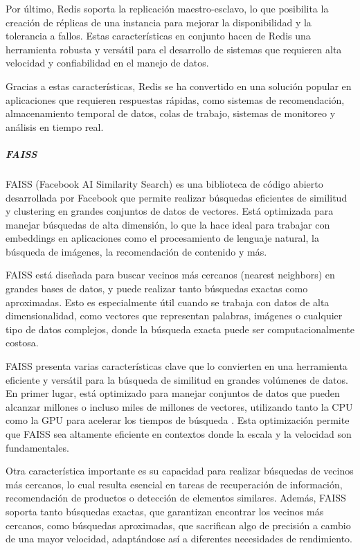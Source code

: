 Por último, Redis soporta la replicación maestro-esclavo, lo que posibilita la creación de réplicas de una instancia para mejorar la disponibilidad y la tolerancia a fallos. Estas características en conjunto hacen de Redis una herramienta robusta y versátil para el desarrollo de sistemas que requieren alta velocidad y confiabilidad en el manejo de datos.

Gracias a estas características, Redis se ha convertido en una solución popular en aplicaciones que requieren respuestas rápidas, como sistemas de recomendación, almacenamiento temporal de datos, colas de trabajo, sistemas de monitoreo y análisis en tiempo real.

\subparagraph{FAISS}    

FAISS (Facebook AI Similarity Search) es una biblioteca de código abierto desarrollada por Facebook que permite realizar búsquedas eficientes de similitud y clustering en grandes conjuntos de datos de vectores. Está optimizada para manejar búsquedas de alta dimensión, lo que la hace ideal para trabajar con embeddings en aplicaciones como el procesamiento de lenguaje natural, la búsqueda de imágenes, la recomendación de contenido y más.

FAISS está diseñada para buscar vecinos más cercanos (nearest neighbors) en grandes bases de datos, y puede realizar tanto búsquedas exactas como aproximadas. Esto es especialmente útil cuando se trabaja con datos de alta dimensionalidad, como vectores que representan palabras, imágenes o cualquier tipo de datos complejos, donde la búsqueda exacta puede ser computacionalmente costosa.

FAISS presenta varias características clave que lo convierten en una herramienta eficiente y versátil para la búsqueda de similitud en grandes volúmenes de datos. En primer lugar, está optimizado para manejar conjuntos de datos que pueden alcanzar millones o incluso miles de millones de vectores, utilizando tanto la CPU como la GPU para acelerar los tiempos de búsqueda \parencite{Johnson2019}. Esta optimización permite que FAISS sea altamente eficiente en contextos donde la escala y la velocidad son fundamentales.

Otra característica importante es su capacidad para realizar búsquedas de vecinos más cercanos, lo cual resulta esencial en tareas de recuperación de información, recomendación de productos o detección de elementos similares. Además, FAISS soporta tanto búsquedas exactas, que garantizan encontrar los vecinos más cercanos, como búsquedas aproximadas, que sacrifican algo de precisión a cambio de una mayor velocidad, adaptándose así a diferentes necesidades de rendimiento.


